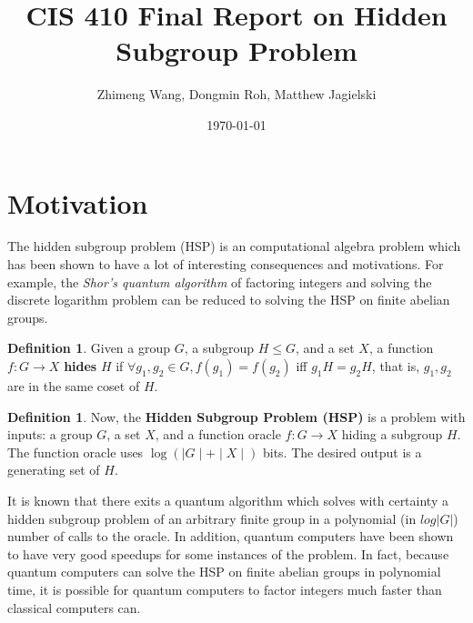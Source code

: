 \documentclass[12pt]{article}
\theoremstyle{plain}
\theoremstyle{definition}
\newtheorem{defn}[thm]{Definition} %
\begin{document}

\title{CIS 410 Final Report on Hidden Subgroup Problem}
\author{Zhimeng Wang, Dongmin Roh, Matthew Jagielski}
\date{\today}



\maketitle


\section{Motivation}

The hidden subgroup problem (HSP) is an computational algebra problem which has been shown to have a lot of interesting consequences and motivations. For example, the \emph{Shor's quantum algorithm} of factoring integers and solving the discrete logarithm problem can be reduced to solving the HSP on finite abelian groups.

\begin{defn}
Given a group $G$, a subgroup $H\le G$, and a set $X$, a function $f:G\rightarrow X$ \textbf{hides} $H$ if $\forall g_1,g_2\in G, f(g_1)=f(g_2)$ iff $g_1H=g_2H$, that is, $g_1,g_2$ are in the same coset of $H$.
\end{defn}

\begin{defn}
Now, the \textbf{Hidden Subgroup Problem (HSP)} is a problem with inputs: a group $G$, a set $X$, and a function oracle $f: G\rightarrow X$ hiding a subgroup $H$. The function oracle uses $\log(\mid G\mid + \mid X\mid)$ bits. The desired output is a generating set of $H$.
\end{defn}

It is known that there exits a quantum algorithm which solves with certainty a hidden subgroup problem of an arbitrary finite group in a polynomial (in $log|G|$) number of calls to the oracle. In addition, quantum computers have been shown to have very good speedups for some instances of the problem. In fact, because quantum computers can solve the HSP on finite abelian groups in polynomial time, it is possible for quantum computers to factor integers much faster than classical computers can.\\
\end{document}
